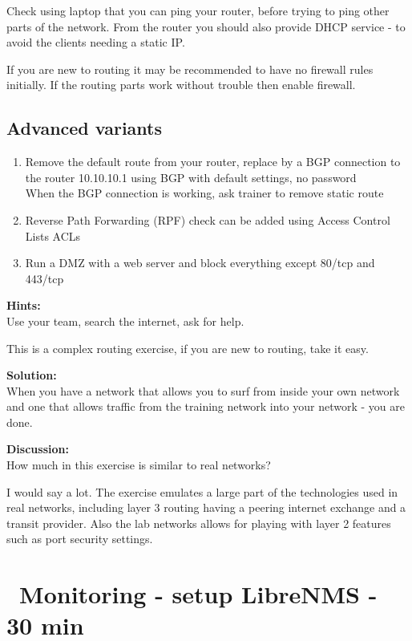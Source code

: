 \documentclass[a4paper,11pt,notitlepage]{report}
\begin{document}
Check using laptop that you can ping your router, before trying to ping other parts of the network. From the router you should also provide DHCP service - to avoid the clients needing a static IP.

If you are new to routing it may be recommended to have no firewall rules initially. If the routing parts work without trouble then enable firewall.

\section*{Advanced variants}
\begin{enumerate}
\item Remove the default route from your router, replace by a BGP connection to the router 10.10.10.1 using BGP with default settings, no password\\
When the BGP connection is working, ask trainer to remove static route
\item Reverse Path Forwarding (RPF) check can be added using Access Control Lists ACLs
\item Run a DMZ with a web server and block everything except 80/tcp and 443/tcp
\end{enumerate}


{\bf Hints:}\\
Use your team, search the internet, ask for help.

This is a complex routing exercise, if you are new to routing, take it easy.

{\bf Solution:}\\
When you have a network that allows you to surf from inside your own network and one that allows traffic from the training network into your network - you are done.

{\bf Discussion:}\\
How much in this exercise is similar to real networks?

I would say a lot. The exercise emulates a large part of the technologies used in real networks, including layer 3 routing having a peering internet exchange and a transit provider. Also the lab networks allows for playing with layer 2 features such as port security settings.

\chapter{\faInfoCircle\ Monitoring - setup LibreNMS - 30 min}
\label{ex:librenms-setup}
\end{document}
